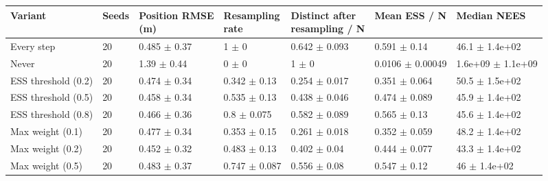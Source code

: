 \begin{tabular}{lllllll}
\toprule
Variant & Seeds & \shortstack[l]{Position RMSE\\(m)} & \shortstack[l]{Resampling\\rate} & \shortstack[l]{Distinct after\\resampling / N} & Mean ESS / N & Median NEES \\
\midrule
Every step & 20 & 0.485 $\pm$ 0.37 & 1 $\pm$ 0 & 0.642 $\pm$ 0.093 & 0.591 $\pm$ 0.14 & 46.1 $\pm$ 1.4e+02 \\
Never & 20 & 1.39 $\pm$ 0.44 & 0 $\pm$ 0 & 1 $\pm$ 0 & 0.0106 $\pm$ 0.00049 & 1.6e+09 $\pm$ 1.1e+09 \\
ESS threshold (0.2) & 20 & 0.474 $\pm$ 0.34 & 0.342 $\pm$ 0.13 & 0.254 $\pm$ 0.017 & 0.351 $\pm$ 0.064 & 50.5 $\pm$ 1.5e+02 \\
ESS threshold (0.5) & 20 & 0.458 $\pm$ 0.34 & 0.535 $\pm$ 0.13 & 0.438 $\pm$ 0.046 & 0.474 $\pm$ 0.089 & 45.9 $\pm$ 1.4e+02 \\
ESS threshold (0.8) & 20 & 0.466 $\pm$ 0.36 & 0.8 $\pm$ 0.075 & 0.582 $\pm$ 0.089 & 0.565 $\pm$ 0.13 & 45.6 $\pm$ 1.4e+02 \\
Max weight (0.1) & 20 & 0.477 $\pm$ 0.34 & 0.353 $\pm$ 0.15 & 0.261 $\pm$ 0.018 & 0.352 $\pm$ 0.059 & 48.2 $\pm$ 1.4e+02 \\
Max weight (0.2) & 20 & 0.452 $\pm$ 0.32 & 0.483 $\pm$ 0.13 & 0.402 $\pm$ 0.04 & 0.444 $\pm$ 0.077 & 43.3 $\pm$ 1.4e+02 \\
Max weight (0.5) & 20 & 0.483 $\pm$ 0.37 & 0.747 $\pm$ 0.087 & 0.556 $\pm$ 0.08 & 0.547 $\pm$ 0.12 & 46 $\pm$ 1.4e+02 \\
\bottomrule
\end{tabular}
